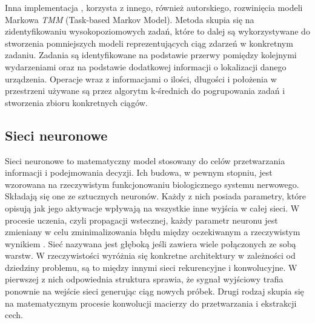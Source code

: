 Inna implementacja \cite{markov_2}, korzysta z innego, również autorskiego, rozwinięcia modeli Markowa \textit{TMM} (Task-based Markov Model). Metoda skupia się na zidentyfikowaniu wysokopoziomowych zadań, które to dalej są wykorzystywane do stworzenia pomniejszych modeli reprezentujących ciąg zdarzeń w konkretnym zadaniu. Zadania są identyfikowane na podstawie przerwy pomiędzy kolejnymi wydarzeniami oraz na podstawie dodatkowej informacji o lokalizacji danego urządzenia. Operacje wraz z informacjami o ilości, długości i położenia w przestrzeni używane są przez algorytm k-średnich do pogrupowania zadań i stworzenia zbioru konkretnych ciągów.



\subsection{Sieci neuronowe}


Sieci neuronowe to matematyczny model stosowany do celów przetwarzania informacji i podejmowania decyzji. Ich budowa, w pewnym stopniu, jest wzorowana na rzeczywistym funkcjonowaniu biologicznego systemu nerwowego. Składają się one ze sztucznych neuronów. Każdy z nich posiada parametry, które opisują jak jego aktywacje wpływają na wszystkie inne wyjścia w całej sieci. W procesie uczenia, czyli propagacji wstecznej, każdy parametr neuronu jest zmieniany w celu zminimalizowania błędu między oczekiwanym a rzeczywistym wynikiem \cite{ksiazka_tf}. Sieć nazywana jest głęboką jeśli zawiera wiele połączonych ze sobą warstw. W rzeczywistości wyróżnia się konkretne architektury w zależności od dziedziny problemu, są to między innymi sieci rekurencyjne i konwolucyjne. W pierwszej z nich odpowiednia struktura sprawia, że sygnał wyjściowy trafia ponownie na wejście sieci generując ciąg nowych próbek. Drugi rodzaj skupia się na matematycznym procesie konwolucji macierzy do przetwarzania i ekstrakcji cech.

